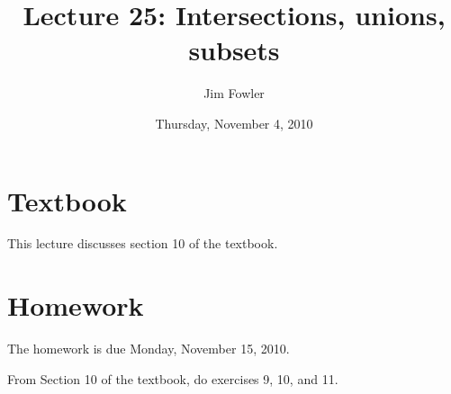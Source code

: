 \documentclass[12pt]{handout}
\title{Lecture 25: Intersections, unions, subsets}
\author{Jim Fowler}
\date{Thursday, November  4, 2010}
\begin{document}
\maketitle

\section*{Textbook}

This lecture discusses section 10 of the textbook.


\section*{Homework} 





The homework is due Monday, November 15, 2010.






From Section 10 of the textbook, do exercises 9, 10, and 11.
\end{document}
